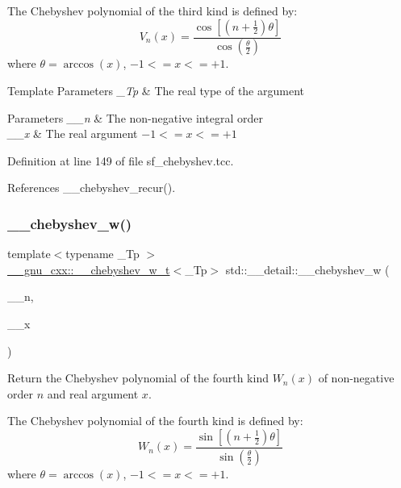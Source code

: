 The Chebyshev polynomial of the third kind is defined by\+: \[ V_n(x) = \frac{\cos \left[ \left(n+\frac{1}{2}\right)\theta \right]} {\cos \left(\frac{\theta}{2}\right)} \] where $ \theta = \arccos(x) $, $ -1 <= x <= +1 $.


\begin{DoxyTemplParams}{Template Parameters}
{\em \+\_\+\+Tp} & The real type of the argument \\
\hline
\end{DoxyTemplParams}

\begin{DoxyParams}{Parameters}
{\em \+\_\+\+\_\+n} & The non-\/negative integral order \\
\hline
{\em \+\_\+\+\_\+x} & The real argument $ -1 <= x <= +1 $ \\
\hline
\end{DoxyParams}


Definition at line 149 of file sf\+\_\+chebyshev.\+tcc.



References \+\_\+\+\_\+chebyshev\+\_\+recur().

\mbox{\label{namespacestd_1_1____detail_ab2a0ec347e56c0fae435c8da507c578c}} 
\subsubsection{\texorpdfstring{\+\_\+\+\_\+chebyshev\+\_\+w()}{\_\_chebyshev\_w()}}
{\footnotesize\ttfamily template$<$typename \+\_\+\+Tp $>$ \\
\hyperlink{struct____gnu__cxx_1_1____chebyshev__w__t}{\+\_\+\+\_\+gnu\+\_\+cxx\+::\+\_\+\+\_\+chebyshev\+\_\+w\+\_\+t}$<$\+\_\+\+Tp$>$ std\+::\+\_\+\+\_\+detail\+::\+\_\+\+\_\+chebyshev\+\_\+w (\begin{DoxyParamCaption}\item[{unsigned int}]{\+\_\+\+\_\+n,  }\item[{\+\_\+\+Tp}]{\+\_\+\+\_\+x }\end{DoxyParamCaption})}

Return the Chebyshev polynomial of the fourth kind $ W_n(x) $ of non-\/negative order $ n $ and real argument $ x $.

The Chebyshev polynomial of the fourth kind is defined by\+: \[ W_n(x) = \frac{\sin \left[ \left(n+\frac{1}{2}\right)\theta \right]} {\sin \left(\frac{\theta}{2}\right)} \] where $ \theta = \arccos(x) $, $ -1 <= x <= +1 $.


